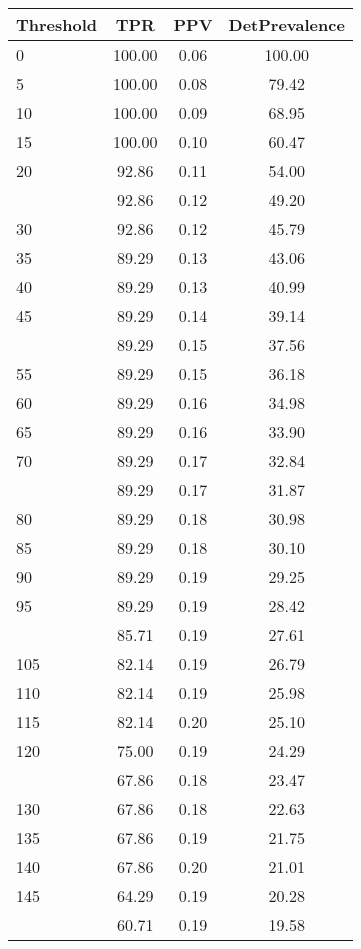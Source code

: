 \begin{table}[ht]
\centering
\begin{tabular}{lccc}
  \toprule
Threshold & TPR & PPV & DetPrevalence \\ 
  \midrule
0 & 100.00 & 0.06 & 100.00 \\ 
  5 & 100.00 & 0.08 & 79.42 \\ 
  10 & 100.00 & 0.09 & 68.95 \\ 
  15 & 100.00 & 0.10 & 60.47 \\ 
  20 & 92.86 & 0.11 & 54.00 \\ 
   \addlinespace
25 & 92.86 & 0.12 & 49.20 \\ 
  30 & 92.86 & 0.12 & 45.79 \\ 
  35 & 89.29 & 0.13 & 43.06 \\ 
  40 & 89.29 & 0.13 & 40.99 \\ 
  45 & 89.29 & 0.14 & 39.14 \\ 
   \addlinespace
50 & 89.29 & 0.15 & 37.56 \\ 
  55 & 89.29 & 0.15 & 36.18 \\ 
  60 & 89.29 & 0.16 & 34.98 \\ 
  65 & 89.29 & 0.16 & 33.90 \\ 
  70 & 89.29 & 0.17 & 32.84 \\ 
   \addlinespace
75 & 89.29 & 0.17 & 31.87 \\ 
  80 & 89.29 & 0.18 & 30.98 \\ 
  85 & 89.29 & 0.18 & 30.10 \\ 
  90 & 89.29 & 0.19 & 29.25 \\ 
  95 & 89.29 & 0.19 & 28.42 \\ 
   \addlinespace
100 & 85.71 & 0.19 & 27.61 \\ 
  105 & 82.14 & 0.19 & 26.79 \\ 
  110 & 82.14 & 0.19 & 25.98 \\ 
  115 & 82.14 & 0.20 & 25.10 \\ 
  120 & 75.00 & 0.19 & 24.29 \\ 
   \addlinespace
125 & 67.86 & 0.18 & 23.47 \\ 
  130 & 67.86 & 0.18 & 22.63 \\ 
  135 & 67.86 & 0.19 & 21.75 \\ 
  140 & 67.86 & 0.20 & 21.01 \\ 
  145 & 64.29 & 0.19 & 20.28 \\ 
   \addlinespace
150 & 60.71 & 0.19 & 19.58 \\ 

\end{tabular}
\end{table}
